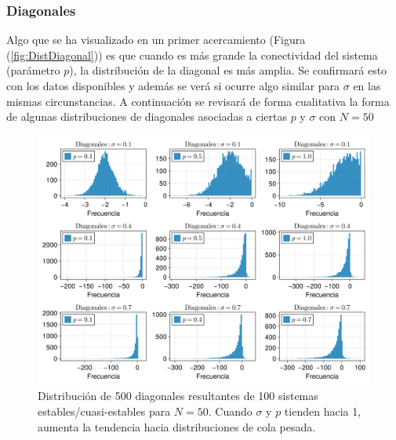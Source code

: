 \subsubsection*{Diagonales}

Algo que se ha visualizado en un primer acercamiento (Figura (\ref{fig:DistDiagonal})) es que cuando es más grande la conectividad del sistema (parámetro $p$), la distribución de la diagonal es más amplia. Se confirmará esto con los datos disponibles y además se verá si ocurre algo similar para $\sigma$ en las mismas circunstancias. A continuación se revisará de forma cualitativa la forma de algunas distribuciones de diagonales asociadas a ciertas $p$ y $\sigma$ con $N=50$
\begin{figure}[h!]
	\centering
	\includegraphics[scale=0.24]{../Imagenes/distDiagonales50}
	\caption{Distribución de 500 diagonales resultantes de 100 sistemas estables/cuasi-estables para $N=50$. Cuando $\sigma$ y $p$ tienden hacia 1, aumenta la tendencia hacia distribuciones de cola pesada.}
	\label{fig:distDiagonales50}
\end{figure}

